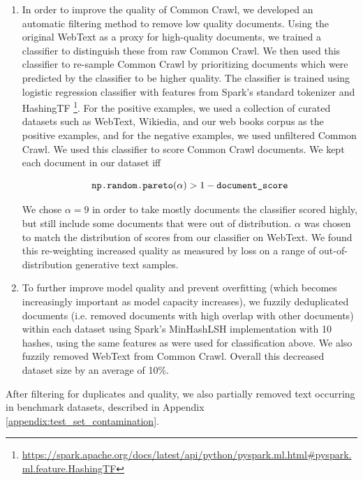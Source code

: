 \documentclass{article}
\begin{document}
\begin{enumerate}

\item In order to improve the quality of Common Crawl, we developed an automatic filtering method to remove low quality documents. Using the original WebText as a proxy for high-quality documents, we trained a classifier to distinguish these from raw Common Crawl. We then used this classifier to re-sample Common Crawl by prioritizing documents which were predicted by the classifier to be higher quality. The classifier is trained using logistic regression classifier with features from Spark's standard tokenizer and HashingTF \footnote{\url{https://spark.apache.org/docs/latest/api/python/pyspark.ml.html\#pyspark.ml.feature.HashingTF}}. For the positive examples, we used a collection of curated datasets such as WebText, Wikiedia, and our web books corpus as the positive examples, and for the negative examples, we used unfiltered Common Crawl.  We used this classifier to score Common Crawl documents. We kept each document in our dataset iff

\[\verb|np.random.pareto|(\alpha) > 1 - \verb|document_score|\]

We chose $\alpha = 9$ in order to take mostly documents the classifier scored highly, but still include some documents that were out of distribution. $\alpha$ was chosen to match the distribution of scores from our classifier on WebText.  We found this re-weighting increased quality as measured by loss on a range of out-of-distribution generative text samples.
\item To further improve model quality and prevent overfitting (which becomes increasingly important as model capacity increases), we fuzzily deduplicated documents (i.e. removed documents with high overlap with other documents) within each dataset using Spark's MinHashLSH implementation with 10 hashes, using the same features as were used for classification above.  We also fuzzily removed WebText from Common Crawl. Overall this decreased dataset size by an average of 10\%.

\end{enumerate}

After filtering for duplicates and quality, we also partially removed text occurring in benchmark datasets, described in Appendix \ref{appendix:test_set_contamination}.
\end{document}
